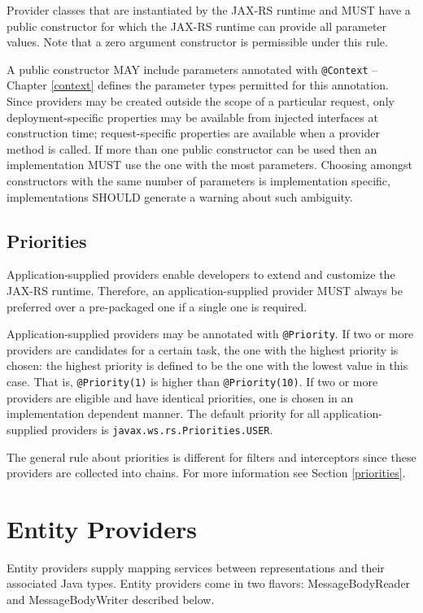 Provider classes that are instantiated by the JAX-RS runtime and MUST have a public constructor for which the JAX-RS
runtime can provide all parameter values. Note that a zero argument constructor is permissible under this rule.

A public constructor MAY include parameters annotated with \lstinline{@Context} -- Chapter \ref{context} defines the
parameter types permitted for this annotation. Since providers may be created outside the scope of a particular request,
only deployment-specific properties may be available from injected interfaces at construction time; request-specific
properties are available when a provider method is called. If more than one public constructor can be used then an
implementation MUST use the one with the most parameters. Choosing amongst constructors with the same number of
parameters is implementation specific, implementations SHOULD generate a warning about such ambiguity.

\subsection{Priorities}
\label{provider_priorities}

Application-supplied providers enable developers to extend and customize the JAX-RS runtime. Therefore, an
application-supplied provider MUST always be preferred over a pre-packaged one if a single one is required.

Application-supplied providers may be annotated with \lstinline{@Priority}. If two or more providers are candidates for
a certain task, the one with the highest priority is chosen: the highest priority is defined to be the one with the
lowest value in this case. That is, \lstinline{@Priority(1)} is higher than \lstinline{@Priority(10)}. If two or more
providers are eligible and have identical priorities, one is chosen in an implementation dependent manner. The default
priority for all application-supplied providers is \lstinline{javax.ws.rs.Priorities.USER}.

The general rule about priorities is different for filters and interceptors since these providers are collected into
chains. For more information see Section \ref{priorities}.

\section{Entity Providers}
\label{entity_providers}

Entity providers supply mapping services between representations and their associated Java types. Entity providers come
in two flavors: MessageBodyReader and MessageBodyWriter described below.

